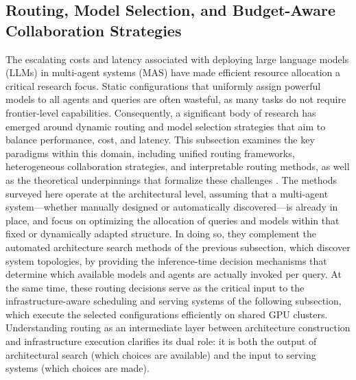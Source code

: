 \documentclass[11pt]{article}
\begin{document}
\subsection{Routing, Model Selection, and Budget-Aware Collaboration Strategies}

The escalating costs and latency associated with deploying large language models (LLMs) in multi-agent systems (MAS) have made efficient resource allocation a critical research focus. Static configurations that uniformly assign powerful models to all agents and queries are often wasteful, as many tasks do not require frontier-level capabilities. Consequently, a significant body of research has emerged around dynamic routing and model selection strategies that aim to balance performance, cost, and latency. This subsection examines the key paradigms within this domain, including unified routing frameworks, heterogeneous collaboration strategies, and interpretable routing methods, as well as the theoretical underpinnings that formalize these challenges \cite{ref279}. The methods surveyed here operate at the architectural level, assuming that a multi-agent system---whether manually designed or automatically discovered---is already in place, and focus on optimizing the allocation of queries and models within that fixed or dynamically adapted structure. In doing so, they complement the automated architecture search methods of the previous subsection, which discover system topologies, by providing the inference-time decision mechanisms that determine which available models and agents are actually invoked per query. At the same time, these routing decisions serve as the critical input to the infrastructure-aware scheduling and serving systems of the following subsection, which execute the selected configurations efficiently on shared GPU clusters. Understanding routing as an intermediate layer between architecture construction and infrastructure execution clarifies its dual role: it is both the output of architectural search (which choices are available) and the input to serving systems (which choices are made).
\end{document}
